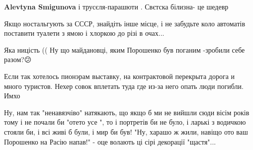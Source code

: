 \begin{itemize}
\begin{itemize}
 
\textbf{Alevtyna Smigunova} і трусєля-парашюти . Свєтска білизна- це шедевр
\end{itemize}

 
Якщо ностальгують за СССР, знайдіть інше місце, і не забудьте коло автоматів
поставити туалети з ямою і хлоркою до різі в очах...


 

Яка ницість (( Ну що майдановці, яким Порошенко був поганим -зробили себе
разом?😕


 

Если так хотелось пионэрам выставку, на контрактовой перекрыта дорога и много
туристов. Нехер совок вплетать туда где из-за него опать люди погибли. Имхо

 

Ну, нам так "ненавязчіво" натякають, що якщо б ми не вийшли сюди вісім років
тому і не почали би "отето усе ", то і портретів би не було, і ларькі з
водичкою стояли би, і всі живі б були, і мир би був! "Ну, харашо ж жили, навіщо
ото ваш Порошенко на Расію напав!" - оце волають ці сірі декорації "щастя"...


 


\end{itemize}
